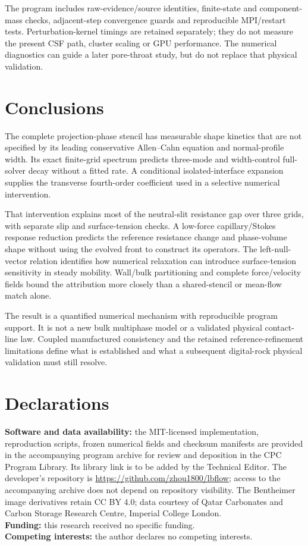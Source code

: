 \documentclass[preprint,12pt]{elsarticle}
\begin{document}
The program includes raw-evidence/source identities, finite-state and
component-mass checks, adjacent-step convergence guards and reproducible
MPI/restart tests. Perturbation-kernel timings are retained
separately; they do not measure the present CSF path, cluster scaling or
GPU performance. The numerical diagnostics can guide a later pore-throat
study, but do not replace that physical validation.

\section{Conclusions}
The complete projection-phase stencil has measurable shape kinetics that
are not specified by its leading conservative Allen--Cahn equation and
normal-profile width. Its exact finite-grid spectrum predicts three-mode
and width-control full-solver decay without a fitted rate.
A conditional isolated-interface expansion supplies the transverse
fourth-order coefficient used in a selective numerical intervention.

That intervention explains most of the neutral-slit resistance gap over
three grids, with separate slip and surface-tension checks.
A low-force capillary/Stokes response reduction predicts the reference
resistance change and phase-volume shape without using the evolved
front to construct its operators. The left-null-vector relation identifies
how numerical relaxation can introduce surface-tension sensitivity in
steady mobility. Wall/bulk partitioning and complete force/velocity fields
bound the attribution more closely than a shared-stencil or mean-flow
match alone.

The result is a quantified numerical mechanism with reproducible program
support. It is not a new bulk multiphase model or a validated physical
contact-line law. Coupled manufactured consistency and the retained
reference-refinement limitations define what is established and what a
subsequent digital-rock physical validation must still resolve.

\section*{Declarations}
\textbf{Software and data availability:} the MIT-licensed implementation,
reproduction scripts, frozen numerical fields and checksum manifests are
provided in the accompanying program archive for review and deposition in
the CPC Program Library. Its library link is to be added by the Technical Editor.
The developer's repository is \url{https://github.com/zhou1800/lbflow};
access to the accompanying archive does not depend on repository visibility.
The Bentheimer image derivatives retain CC BY 4.0; data courtesy of
Qatar Carbonates and Carbon Storage Research Centre, Imperial College London.\\
\textbf{Funding:} this research received no specific funding.\\
\textbf{Competing interests:} the author declares no competing interests.\\
\end{document}

